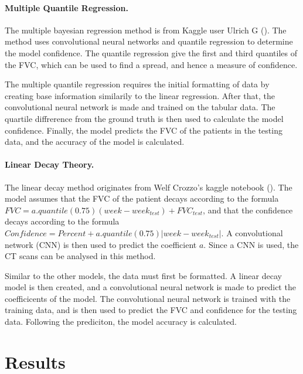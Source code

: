 \documentclass[12pt]{article}
\begin{document}
\paragraph*{Multiple Quantile Regression.}

The multiple bayesian regression method is from Kaggle user Ulrich G (\cite{multiplequantile}). 
The method uses convolutional neural networks and quantile regression to determine the model confidence. 
The quantile regression give the first and third quantiles of the FVC, which can be used to find a spread, and hence a measure of confidence. 

The multiple quantile regression requires the initial formatting of data by creating base information similarily to the linear regression.
After that, the convolutional neural network is made and trained on the tabular data.
The quartile diffrerence from the ground truth is then used to calculate the model confidence.
Finally, the model predicts the FVC of the patients in the testing data, and the accuracy of the model is calculated.

\paragraph*{Linear Decay Theory.}

The linear decay method originates from Welf Crozzo's kaggle notebook (\cite{lineardecay}).
The model assumes that the FVC of the patient decays according to the formula $FVC = a.quantile(0.75)(week - week_{test}) + FVC_{test}$, and that the confidence decays according to the formula $Confidence = Percent + a.quantile(0.75)|week - week_{test}|$.
A convolutional network (CNN) is then used to predict the coefficient $a$. 
Since a CNN is used, the CT scans can be analysed in this method.

Similar to the other models, the data must first be formatted. 
A linear decay model is then created, and a convolutional neural network is made to predict the coefficicents of the model.
The convolutional neural network is trained with the training data, and is then used to predict the FVC and confidence for the testing data.
Following the prediciton, the model accuracy is calculated.

\section{Results}
\end{document}
